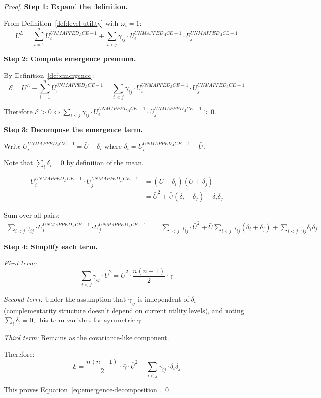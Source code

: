 \begin{proof}
\textbf{Step 1: Expand the definition.}

From Definition~\ref{def:level-utility} with $\omega_i = 1$:
\begin{equation}
U^L = \sum_{i=1}^{n} U^{UNMAPPED_ACE-1}_i + \sum_{i<j} \gamma_{ij} \cdot U^{UNMAPPED_ACE-1}_i \cdot U^{UNMAPPED_ACE-1}_j
\end{equation}

\textbf{Step 2: Compute emergence premium.}

By Definition~\ref{def:emergence}:
\begin{equation}
\mathcal{E} = U^L - \sum_{i=1}^{n} U^{UNMAPPED_ACE-1}_i = \sum_{i<j} \gamma_{ij} \cdot U^{UNMAPPED_ACE-1}_i \cdot U^{UNMAPPED_ACE-1}_j
\end{equation}

Therefore $\mathcal{E} > 0 \Leftrightarrow \sum_{i<j} \gamma_{ij} \cdot U^{UNMAPPED_ACE-1}_i \cdot U^{UNMAPPED_ACE-1}_j > 0$. \checkmark

\textbf{Step 3: Decompose the emergence term.}

Write $U^{UNMAPPED_ACE-1}_i = \bar{U} + \delta_i$ where $\delta_i = U^{UNMAPPED_ACE-1}_i - \bar{U}$.

Note that $\sum_i \delta_i = 0$ by definition of the mean.

\begin{align}
U^{UNMAPPED_ACE-1}_i \cdot U^{UNMAPPED_ACE-1}_j &= (\bar{U} + \delta_i)(\bar{U} + \delta_j) \\
&= \bar{U}^2 + \bar{U}(\delta_i + \delta_j) + \delta_i \delta_j
\end{align}

Sum over all pairs:
\begin{align}
\sum_{i<j} \gamma_{ij} \cdot U^{UNMAPPED_ACE-1}_i \cdot U^{UNMAPPED_ACE-1}_j &=
\sum_{i<j} \gamma_{ij} \cdot \bar{U}^2 +
\bar{U} \sum_{i<j} \gamma_{ij} (\delta_i + \delta_j) +
\sum_{i<j} \gamma_{ij} \delta_i \delta_j
\end{align}

\textbf{Step 4: Simplify each term.}

\textit{First term:}
\begin{equation}
\sum_{i<j} \gamma_{ij} \cdot \bar{U}^2 = \bar{U}^2 \cdot \frac{n(n-1)}{2} \cdot \bar{\gamma}
\end{equation}

\textit{Second term:} Under the assumption that $\gamma_{ij}$ is independent of $\delta_i$
(complementarity structure doesn't depend on current utility levels), and noting
$\sum_i \delta_i = 0$, this term vanishes for symmetric $\gamma$.

\textit{Third term:} Remains as the covariance-like component.

Therefore:
\begin{equation}
\mathcal{E} = \frac{n(n-1)}{2} \cdot \bar{\gamma} \cdot \bar{U}^2 + \sum_{i<j} \gamma_{ij} \cdot \delta_i \delta_j
\end{equation}

This proves Equation~\ref{eq:emergence-decomposition}. \qed
\end{proof}


